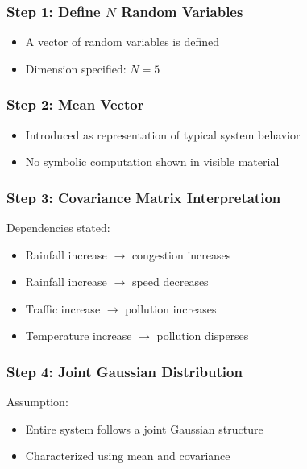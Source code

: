 \documentclass[12pt]{article}
\begin{document}
\subsubsection*{Step 1: Define \( N \) Random Variables}

\begin{itemize}
\item A vector of random variables is defined
\item Dimension specified: \( N = 5 \)
\end{itemize}

\subsubsection*{Step 2: Mean Vector}

\begin{itemize}
\item Introduced as representation of typical system behavior
\item No symbolic computation shown in visible material
\end{itemize}

\subsubsection*{Step 3: Covariance Matrix Interpretation}

Dependencies stated:

\begin{itemize}
\item Rainfall increase $\rightarrow$ congestion increases
\item Rainfall increase $\rightarrow$ speed decreases
\item Traffic increase $\rightarrow$ pollution increases
\item Temperature increase $\rightarrow$ pollution disperses
\end{itemize}

\subsubsection*{Step 4: Joint Gaussian Distribution}

Assumption:

\begin{itemize}
\item Entire system follows a joint Gaussian structure
\item Characterized using mean and covariance
\end{itemize}
\end{document}
